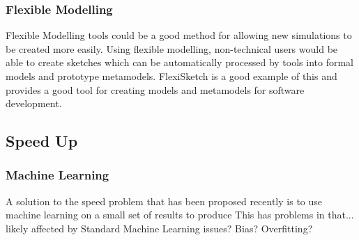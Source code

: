 \documentclass{UoYCSproject}
\begin{document}





\subsubsection{Flexible Modelling}
Flexible Modelling tools could be a good method for allowing new simulations to be created more easily. Using flexible modelling, non-technical users would be able to create sketches which can be automatically processed by tools into formal models and prototype metamodels\cite{Paige2017}. FlexiSketch is a good example of this and provides a good tool for creating models and metamodels for software development\cite{flexisketch}.

\subsection{Speed Up}

\subsubsection{Machine Learning}
A solution to the speed problem that has been proposed recently is to use machine learning on a small set of results to produce\cite{kieran_machine_learning}
This has problems in that...
likely affected by Standard Machine Learning issues? Bias? Overfitting?
\end{document}
